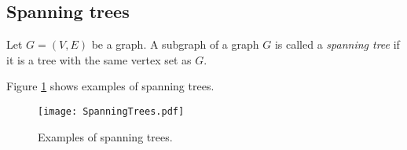 \begin{page}
\setcounter{section}{2}
\setcounter{subsection}{4}
\setcounter{dfn}{9}
\label{portion:276}




\end{page}

\begin{page}
\setcounter{section}{2}
\setcounter{subsection}{4}
\setcounter{dfn}{9}
\label{portion:278}

\subsection{Spanning trees}

\end{page}

\begin{page}
\setcounter{section}{2}
\setcounter{subsection}{4}
\setcounter{dfn}{10}
\label{portion:280}

\begin{dfn}
Let $G = (V, E)$ be a graph.
A subgraph of a graph $G$ is called a \emph{spanning tree} if it is a tree with the same vertex set as $G$.
\end{dfn}

\end{page}

\begin{page}
\setcounter{section}{2}
\setcounter{subsection}{4}
\setcounter{dfn}{10}
\label{portion:281}


Figure \ref{fig:SpanningTrees} shows examples of spanning trees.

\begin{figure}[ht]
\begin{center}
\texttt{[image: SpanningTrees.pdf]}
\end{center}
\caption{Examples of spanning trees.}
\label{fig:SpanningTrees}
\end{figure}


\end{page}

